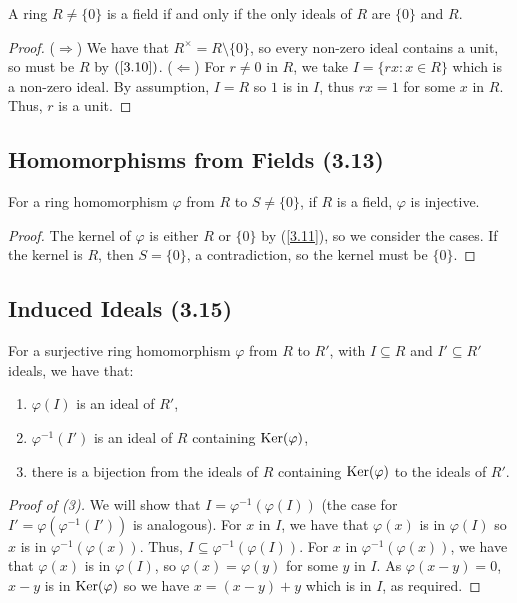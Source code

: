 A ring $R \neq \{0\}$ is a field if and only if the only ideals
of $R$ are $\{0\}$ and $R$.

\begin{proof}
    ($\Longrightarrow$) We have that $R^\times = R \setminus \{0\}$,
    so every non-zero ideal contains a unit, so must be $R$ by 
    $(\ref{3.10})$. \bs
    ($\Longleftarrow$) For $r \neq 0$ in $R$, we take 
    $I = \{rx : x \in R\}$ which is a non-zero ideal. By assumption,
    $I = R$ so $1$ is in $I$, thus $rx = 1$ for some $x$ in $R$.
    Thus, $r$ is a unit.
\end{proof}

\subsection{Homomorphisms from Fields (3.13)} \label{3.13}

For a ring homomorphism $\varphi$ from $R$ to $S \neq \{0\}$, if $R$
is a field, $\varphi$ is injective.

\begin{proof}
    The kernel of $\varphi$ is either $R$ or $\{0\}$ by (\ref{3.11}),
    so we consider the cases.
    If the kernel is $R$, then $S = \{0\}$, a contradiction,
    so the kernel must be $\{0\}$.
\end{proof}

\subsection{Induced Ideals (3.15)} \label{3.15}

For a surjective ring homomorphism $\varphi$ from $R$ to $R'$,
with $I \subseteq R$ and $I' \subseteq R'$ ideals,
we have that: \begin{enumerate}
    \item $\varphi(I)$ is an ideal of $R'$,
    \item $\varphi^{-1}(I')$ is an ideal of $R$ containing
        $\operatorname{Ker}(\varphi)$,
    \item there is a bijection from the ideals of $R$ containing
        $\operatorname{Ker}(\varphi)$ to the ideals of $R'$.
\end{enumerate}

\begin{proof}[Proof of (3)]
    We will show that $I = \varphi^{-1}(\varphi(I))$ (the case for
    $I' = \varphi(\varphi^{-1}(I'))$ is analogous). For $x$ in $I$,
    we have that $\varphi(x)$ is in $\varphi(I)$ so $x$ is in 
    $\varphi^{-1}(\varphi(x))$. Thus, 
    $I \subseteq \varphi^{-1}(\varphi(I))$. For $x$ in 
    $\varphi^{-1}(\varphi(x))$, we have that $\varphi(x)$ is in
    $\varphi(I)$, so $\varphi(x) = \varphi(y)$ for some $y$ in $I$.
    As $\varphi(x - y) = 0$, $x - y$ is in $\operatorname{Ker}(\varphi)$ so we have
    $x = (x - y) + y$ which is in $I$, as required.  
\end{proof}

